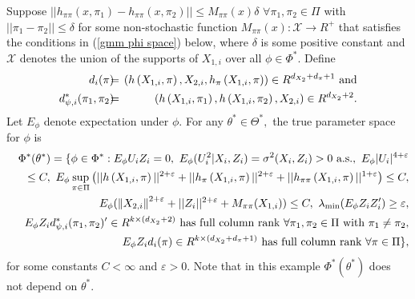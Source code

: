 \documentclass[12pt,thmsb,titlepage,final,oneside,letterpaper]{article}
\begin{document}
Suppose $||h_{\pi \pi }(x,\pi _{1})-h_{\pi \pi }(x,\pi _{2})||\leq M_{\pi
\pi }(x)\delta $ $\forall \pi _{1},\pi _{2}\in \Pi $ with $||\pi _{1}-\pi
_{2}||\leq \delta $ for some non-stochastic function $M_{\pi \pi }(x):%
\mathcal{X}\rightarrow R^{+}$ that satisfies the conditions in (\ref{gmm phi
space}) below, where $\delta $ is some positive constant and $\mathcal{X}$
denotes the union of the supports of $X_{1,i}$ over all $\phi \in \Phi
^{\ast }.$ Define%
\begin{eqnarray}
d_{i}(\pi )\hspace{-0.08in} &=&\hspace{-0.08in}(h\left( X_{1,i},\pi \right)
,X_{2,i},h_{\pi }\left( X_{1,i},\pi \right) )\in R^{d_{X_{2}}+d_{\pi }+1}%
\text{ and}  \notag \\
d_{\psi ,i}^{\ast }(\pi _{1},\pi _{2})\hspace{-0.08in} &=&\hspace{-0.08in}%
(h\left( X_{1,i},\pi _{1}\right) ,h\left( X_{1,i},\pi _{2}\right)
,X_{2,i})\in R^{d_{X_{2}}+2}.
\end{eqnarray}%
Let $E_{\phi }$ denote expectation under $\phi .$ For any $\theta ^{\ast
}\in \Theta ^{\ast },$ the true parameter space for $\phi $ is 
\begin{eqnarray}
&&\Phi ^{\ast }(\theta ^{\ast })\overset{}{=}\{\phi \overset{}{\in }\Phi
^{\ast }:E_{\phi }U_{i}Z_{i}\overset{}{=}0,\text{ }E_{\phi
}(U_{i}^{2}|X_{i},Z_{i})=\sigma ^{2}(X_{i},Z_{i})>0\text{ a.s.},\text{ }%
E_{\phi }|U_{i}|^{4+\varepsilon }  \notag \\
&&\overset{}{\leq }C,\text{ }E_{\phi }\sup_{\pi \in \Pi }\left( ||h\left(
X_{1,i},\pi \right) ||^{2+\varepsilon }+||h_{\pi }\left( X_{1,i},\pi \right)
||^{2+\varepsilon }+||h_{\pi \pi }\left( X_{1,i},\pi \right)
||^{1+\varepsilon }\right) \overset{}{\leq }C,  \notag \\
&&E_{\phi }(\left\Vert X_{2,i}\right\Vert ^{2+\varepsilon
}+||Z_{i}||^{2+\varepsilon }+M_{\pi \pi }(X_{1,i}))\overset{}{\leq }C,\text{ 
}\lambda _{\min }(E_{\phi }Z_{i}Z_{i}^{\prime })\geq \varepsilon ,  \notag \\
&&E_{\phi }Z_{i}d_{\psi ,i}^{\ast }(\pi _{1},\pi _{2})^{\prime }\in
R^{k\times (d_{X_{2}}+2)}\text{ has full column rank }\forall \pi _{1},\pi
_{2}\overset{}{\in }\Pi \text{ with }\pi _{1}\overset{}{\neq }\pi _{2}, 
\notag \\
&&E_{\phi }Z_{i}d_{i}(\pi )\in R^{k\times (d_{X_{2}}+d_{\pi }+1)}\text{ has
full column rank }\forall \pi \overset{}{\in }\Pi \},  \label{gmm phi space}
\end{eqnarray}%
for some constants $C<\infty $ and $\varepsilon >0.$ Note that in this
example $\Phi ^{\ast }(\theta ^{\ast })$ does not depend on $\theta ^{\ast
}. $
\end{document}
